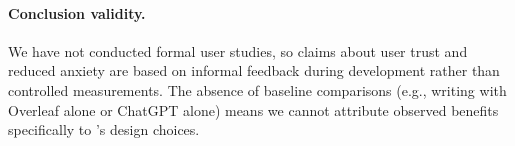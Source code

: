 \paragraph{Conclusion validity.}
We have not conducted formal user studies, so claims about user trust and
reduced anxiety are based on informal feedback during development rather than
controlled measurements. The absence of baseline comparisons (e.g., writing
with Overleaf alone or ChatGPT alone) means we cannot attribute observed
benefits specifically to \software{}'s design choices.
